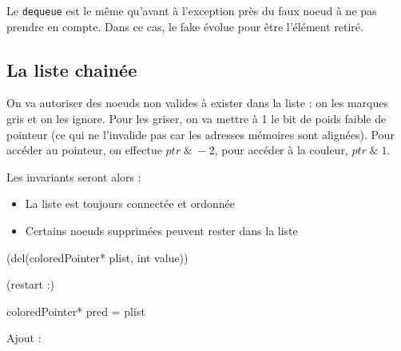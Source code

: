 \documentclass{article}
\begin{document}
Le \texttt{dequeue} est le même qu'avant à l'exception près du faux noeud à ne pas prendre en compte. Dans ce cas, le fake évolue pour être l'élément retiré.




\subsection{La liste chainée}
On va autoriser des noeuds non valides à exister dans la liste : on les marques gris et on les ignore. Pour les griser, on va mettre à 1 le bit de poids faible de pointeur (ce qui ne l'invalide pas car les adresses mémoires sont alignées). Pour accéder au pointeur, on effectue $ptr \; \& \; -2$, pour accéder à la couleur, $ptr \; \& \; 1$.

Les invariants seront alors :
\begin{itemize}
\item La liste est toujours connectée et ordonnée
\item Certains noeuds supprimées peuvent rester dans la liste
\end{itemize}

\begin{algorithm}[H]
\Void({del(coloredPointer* plist, int value)}){
	\Label(restart :){
		coloredPointer* pred = plist\;
		
		
	}
}

\end{algorithm}


Ajout :
\end{document}
